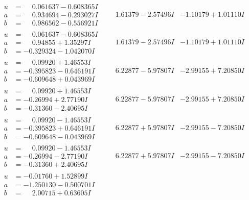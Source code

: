 \documentclass[1p]{elsarticle_modified}
\theoremstyle{definition}
\begin{document}
$$\begin{array}{c|c|c}
\begin{aligned}
u &= \phantom{-}0.061637 - 0.608365 I \\
a &= \phantom{-}0.934694 - 0.293027 I \\
b &= \phantom{-}0.986562 - 0.556921 I\end{aligned}
 & \phantom{-}1.61379 - 2.57496 I & -1.10179 + 1.01110 I \\ \hline\begin{aligned}
u &= \phantom{-}0.061637 - 0.608365 I \\
a &= \phantom{-}0.94855 + 1.35297 I \\
b &= -0.329324 - 1.042070 I\end{aligned}
 & \phantom{-}1.61379 - 2.57496 I & -1.10179 + 1.01110 I \\ \hline\begin{aligned}
u &= \phantom{-}0.09920 + 1.46553 I \\
a &= -0.395823 - 0.646191 I \\
b &= -0.609648 + 0.043969 I\end{aligned}
 & \phantom{-}6.22877 - 5.97807 I & -2.99155 + 7.20850 I \\ \hline\begin{aligned}
u &= \phantom{-}0.09920 + 1.46553 I \\
a &= -0.26994 + 2.77190 I \\
b &= -0.31360 - 2.40695 I\end{aligned}
 & \phantom{-}6.22877 - 5.97807 I & -2.99155 + 7.20850 I \\ \hline\begin{aligned}
u &= \phantom{-}0.09920 - 1.46553 I \\
a &= -0.395823 + 0.646191 I \\
b &= -0.609648 - 0.043969 I\end{aligned}
 & \phantom{-}6.22877 + 5.97807 I & -2.99155 - 7.20850 I \\ \hline\begin{aligned}
u &= \phantom{-}0.09920 - 1.46553 I \\
a &= -0.26994 - 2.77190 I \\
b &= -0.31360 + 2.40695 I\end{aligned}
 & \phantom{-}6.22877 + 5.97807 I & -2.99155 - 7.20850 I \\ \hline\begin{aligned}
u &= -0.01760 + 1.52899 I \\
a &= -1.250130 - 0.500701 I \\
b &= \phantom{-}2.00715 + 0.63605 I\end{aligned}

\end{array}$$
\end{document}
